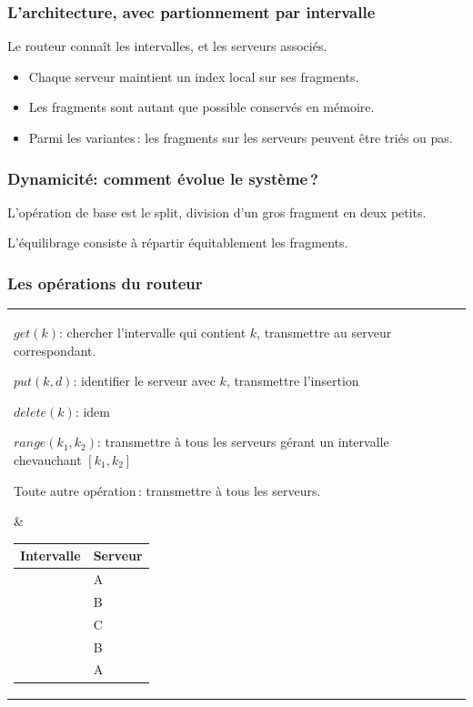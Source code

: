\begin{frame}
\frametitle{L'architecture, avec partionnement par intervalle}

Le routeur connaît les intervalles, et les serveurs associés.


\begin{remark}
\begin{itemize}
   \item Chaque serveur maintient un index local sur ses fragments.
   \item Les fragments sont autant que possible conservés en mémoire.
  \item Parmi les variantes\,: les fragments sur les serveurs peuvent être triés ou pas. 
\end{itemize}
\end{remark}
\end{frame}


\begin{frame}
\frametitle{Dynamicité: comment évolue le système\,?}

L'opération de base est le \alert{split}, division d'un gros fragment en deux petits.


\alert{L'équilibrage} consiste à répartir équitablement les fragments.

\end{frame}

\begin{frame}
\frametitle{Les opérations du routeur}

\begin{tabular}{l|p{6cm}}
   \parbox{5cm}{
$get(k)$: chercher l'intervalle qui contient $k$, transmettre
au serveur correspondant.

\smallskip

$put(k, d)$: identifier le serveur avec $k$, transmettre l'insertion
 
 \smallskip
 
 $delete(k)$: idem
 
 \smallskip
 
 $range(k_1, k_2)$: transmettre à tous les serveurs gérant un intervalle chevauchant $[k_1, k_2]$
 
 \smallskip
 
 Toute autre opération\,: transmettre à tous les serveurs.
   }  %
  & 
  \parbox{6cm}{
 
\begin{tabular}{r|l}
Intervalle  & Serveur\\
\hline
$]-\infty, a]$ & A  \\
$[a+1, b]$ & B  \\
$[b+1, c]$ & C  \\
$[c+1, d]$ & B  \\
$[d+1, \infty[$ & A  \\
\hline
\end{tabular}

}

\end{tabular}

\end{frame}


